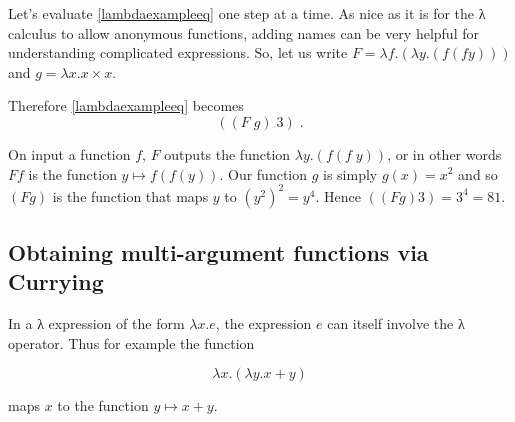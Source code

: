 Let's evaluate \eqref{lambdaexampleeq} one step at a time. As nice as it
is for the λ calculus to allow anonymous functions, adding names can be
very helpful for understanding complicated expressions. So, let us write
\(F = \lambda f.(\lambda y.(f (f y)))\) and \(g = \lambda x.x\times x\).

Therefore \eqref{lambdaexampleeq} becomes \[
((F \; g)\;  3) \;.
\]

On input a function \(f\), \(F\) outputs the function
\(\lambda y.(f (f\; y))\), or in other words \(F f\) is the function
\(y \mapsto f(f(y))\). Our function \(g\) is simply \(g(x)=x^2\) and so
\((F g)\) is the function that maps \(y\) to \((y^2)^2= y^4\). Hence
\(((F g) 3) = 3^4 = 81\).

\hypertarget{lambdaexptwoex}{}


\subsection{Obtaining multi-argument functions via
Currying}\label{curryingsec}

In a λ expression of the form \(\lambda x. e\), the expression \(e\) can
itself involve the λ operator. Thus for example the function

\[
\lambda x. (\lambda y. x+y) \label{eqlambdaexampleone}
\]

maps \(x\) to the function \(y \mapsto x+y\).

